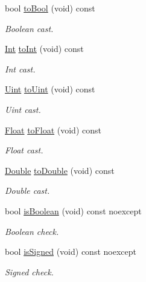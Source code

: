 \begin{DoxyCompactItemize}
bool \mbox{\hyperlink{classo_a_1_1_string_a838537de7617a227e77662090f25d5a9}{to\+Bool}} (void) const
\begin{DoxyCompactList}\small\item\em Boolean cast. \end{DoxyCompactList}\item 
\mbox{\hyperlink{namespaceo_a_aa575525a7b0116822c73d43fa671a58c}{Int}} \mbox{\hyperlink{classo_a_1_1_string_a8aab531770e6d4abe2a3e85d55f69ead}{to\+Int}} (void) const
\begin{DoxyCompactList}\small\item\em Int cast. \end{DoxyCompactList}\item 
\mbox{\hyperlink{namespaceo_a_abe1d8250226c5cf34f84d7b75fc7922e}{Uint}} \mbox{\hyperlink{classo_a_1_1_string_a959f6a81bf2fa3e6fa001642608e2af2}{to\+Uint}} (void) const
\begin{DoxyCompactList}\small\item\em Uint cast. \end{DoxyCompactList}\item 
\mbox{\hyperlink{namespaceo_a_a513e9cb16924b482268ab3fcdf1f2499}{Float}} \mbox{\hyperlink{classo_a_1_1_string_a109668ec1795a27a5c44b33ec53e56a3}{to\+Float}} (void) const
\begin{DoxyCompactList}\small\item\em Float cast. \end{DoxyCompactList}\item 
\mbox{\hyperlink{namespaceo_a_a2bcc976232176d2dcf8b9df1fa33c038}{Double}} \mbox{\hyperlink{classo_a_1_1_string_a609bc93f4fdb26cc79d26747741af787}{to\+Double}} (void) const
\begin{DoxyCompactList}\small\item\em Double cast. \end{DoxyCompactList}\item 
bool \mbox{\hyperlink{classo_a_1_1_string_af57b0b992d2ce2995f3f843d7dd36e96}{is\+Boolean}} (void) const noexcept
\begin{DoxyCompactList}\small\item\em Boolean check. \end{DoxyCompactList}\item 
bool \mbox{\hyperlink{classo_a_1_1_string_ac88615009b2cdba26d1bf42187a66eb7}{is\+Signed}} (void) const noexcept
\begin{DoxyCompactList}\small\item\em Signed check. \end{DoxyCompactList}\item 

\end{DoxyCompactItemize}

